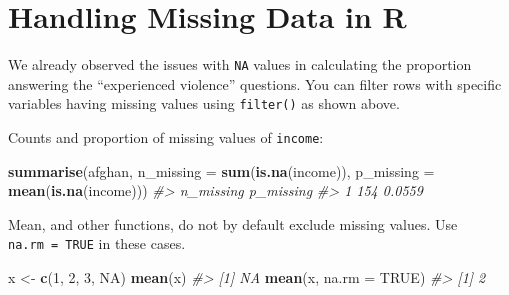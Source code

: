 \documentclass[]{book}
\newenvironment{Shaded}{\begin{snugshade}}{\end{snugshade}}
\newcommand{\CommentTok}[1]{\textcolor[rgb]{0.56,0.35,0.01}{\textit{#1}}}
\newcommand{\DataTypeTok}[1]{\textcolor[rgb]{0.13,0.29,0.53}{#1}}
\newcommand{\DecValTok}[1]{\textcolor[rgb]{0.00,0.00,0.81}{#1}}
\newcommand{\KeywordTok}[1]{\textcolor[rgb]{0.13,0.29,0.53}{\textbf{#1}}}
\newcommand{\NormalTok}[1]{#1}
\newcommand{\OperatorTok}[1]{\textcolor[rgb]{0.81,0.36,0.00}{\textbf{#1}}}
\newcommand{\OtherTok}[1]{\textcolor[rgb]{0.56,0.35,0.01}{#1}}
\newcommand{\StringTok}[1]{\textcolor[rgb]{0.31,0.60,0.02}{#1}}
\theoremstyle{definition}
\theoremstyle{definition}
\theoremstyle{definition}
\theoremstyle{remark}
\begin{document}
\hypertarget{handling-missing-data-in-r}{%
\section{Handling Missing Data in R}\label{handling-missing-data-in-r}}

We already observed the issues with \texttt{NA} values in calculating
the proportion answering the ``experienced violence'' questions. You can
filter rows with specific variables having missing values using
\texttt{filter()} as shown above.

\begin{Shaded}
\end{Shaded}

Counts and proportion of missing values of \texttt{income}:

\begin{Shaded}
\begin{Highlighting}[]
\KeywordTok{summarise}\NormalTok{(afghan,}
          \DataTypeTok{n_missing =} \KeywordTok{sum}\NormalTok{(}\KeywordTok{is.na}\NormalTok{(income)),}
          \DataTypeTok{p_missing =} \KeywordTok{mean}\NormalTok{(}\KeywordTok{is.na}\NormalTok{(income)))}
\CommentTok{#>   n_missing p_missing}
\CommentTok{#> 1       154    0.0559}
\end{Highlighting}
\end{Shaded}

Mean, and other functions, do not by default exclude missing values. Use
\texttt{na.rm\ =\ TRUE} in these cases.

\begin{Shaded}
\begin{Highlighting}[]
\NormalTok{x <-}\StringTok{ }\KeywordTok{c}\NormalTok{(}\DecValTok{1}\NormalTok{, }\DecValTok{2}\NormalTok{, }\DecValTok{3}\NormalTok{, }\OtherTok{NA}\NormalTok{)}
\KeywordTok{mean}\NormalTok{(x)}
\CommentTok{#> [1] NA}
\KeywordTok{mean}\NormalTok{(x, }\DataTypeTok{na.rm =} \OtherTok{TRUE}\NormalTok{)}
\CommentTok{#> [1] 2}
\end{Highlighting}
\end{Shaded}
\end{document}
